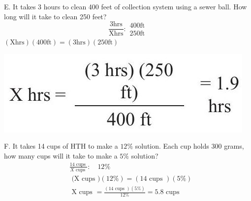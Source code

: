 \documentclass[10pt]{article}
\begin{document}
E. It takes 3 hours to clean 400 feet of collection system using a sewer ball. How long will it take to clean 250 feet?
$$
\frac{3 \mathrm{hrs}}{\mathrm{Xhrs}}: \begin{gathered}
400 \mathrm{ft} \\
250 \mathrm{ft}
\end{gathered}
$$
$(\mathrm{X} \mathrm{hrs})(400 \mathrm{ft})=(3 \mathrm{hrs})(250 \mathrm{ft})$

\includegraphics[max width=\textwidth]{2022_09_11_72dbedc910e6e984560cg-73}

F. It takes 14 cups of $\mathrm{HTH}$ to make a $12 \%$ solution. Each cup holds 300 grams, how many cups will it take to make a $5 \%$ solution?
$$
\begin{aligned}
&\frac{14 \text { cups }}{X \text { cups }}: \quad 12 \% \\
&\text { (X cups })(12 \%)=(14 \text { cups })(5 \%) \\
&\text { X cups }=\frac{(14 \text { cups })(5 \%)}{12 \%}=5.8 \text { cups }
\end{aligned}
$$
\end{document}
